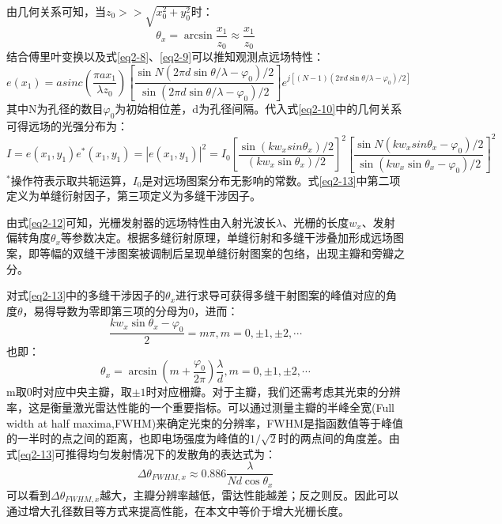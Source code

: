 \documentclass[UTF8,a4paper,12pt]{ctexart}
\numberwithin{equation}{section}
\begin{document}
由几何关系可知，当$z_0>>\sqrt{x^2_0+y^2_0}$时：
\begin{equation}
    \theta_x = \arcsin \frac{x_1}{z_0}  \approx \frac{x_1}{z_0}
    \label{eq2-11}
\end{equation}
结合傅里叶变换以及式\ref{eq2-8}、\ref{eq2-9}可以推知观测点远场特性：
\begin{equation}
    e(x_1)=asinc(\frac{\pi ax_1}{\lambda z_0})\left[\frac{\sin{N(2\pi d\sin{\theta /\lambda-\varphi_0})/2}}{\sin{(2\pi d\sin{\theta /\lambda-\varphi_0})/2}}\right]e^{j[(N-1)(2\pi d\sin{\theta}/\lambda-\varphi_0)/2]}
    \label{eq2-12}
\end{equation}
其中N为孔径的数目$\varphi_0$为初始相位差，d为孔径间隔。代入式\ref{eq2-10}中的几何关系可得远场的光强分布为：
\begin{equation}
    I=e(x_1,y_1)e^*(x_1,y_1)=|e(x_1,y_1)|^2=I_0
    \left[\frac{\sin{(kw_xsin\theta_x)/2}}{(kw_x\sin\theta_x)/2} \right]^2
    \left[\frac{\sin{N(kw_xsin\theta_x-\varphi_0)/2}}{\sin(kw_x\sin\theta_x-\varphi_0)/2} \right]^2
    \label{eq2-13}
\end{equation}
$^*$操作符表示取共轭运算，$I_0$是对远场图案分布无影响的常数。式\ref{eq2-13}中第二项定义为单缝衍射因子，第三项定义为多缝干涉因子。

由式\ref{eq2-12}可知，光栅发射器的远场特性由入射光波长$\lambda$、光栅的长度$w_x$、发射偏转角度$\theta_x$等参数决定。根据多缝衍射原理，单缝衍射和多缝干涉叠加形成远场图案，即等幅的双缝干涉图案被调制后呈现单缝衍射图案的包络，出现主瓣和旁瓣之分。

对式\ref{eq2-13}中的多缝干涉因子的$\theta_x$进行求导可获得多缝干射图案的峰值对应的角度$\theta$，易得导数为零即第三项的分母为0，进而：
\begin{equation}
    \frac{kw_x\sin{\theta_x}-\varphi_0}{2}=m\pi,m=0,\pm1,\pm2,\cdots
\end{equation}
也即：
\begin{equation}
    \theta_x = \arcsin{(m+\frac{\varphi_0}{2\pi})\frac{\lambda}{d}},m=0,\pm1,\pm2,\cdots
\end{equation}
m取0时对应中央主瓣，取$\pm1$时对应栅瓣。对于主瓣，我们还需考虑其光束的分辨率，这是衡量激光雷达性能的一个重要指标。可以通过测量主瓣的半峰全宽(Full width at half maxima,FWHM)来确定光束的分辨率，FWHM是指函数值等于峰值的一半时的点之间的距离，也即电场强度为峰值的$1/\sqrt{2}$时的两点间的角度差。由式\ref{eq2-13}可推得均匀发射情况下的发散角的表达式为：
\begin{equation}
    \Delta\theta_{FWHM,x} \approx 0.886\frac{\lambda}{Nd\cos\theta_x}
    \label{eq2-16}
\end{equation}
可以看到$\Delta\theta_{FWHM,x}$越大，主瓣分辨率越低，雷达性能越差；反之则反。因此可以通过增大孔径数目等方式来提高性能，在本文中等价于增大光栅长度。
\end{document}
